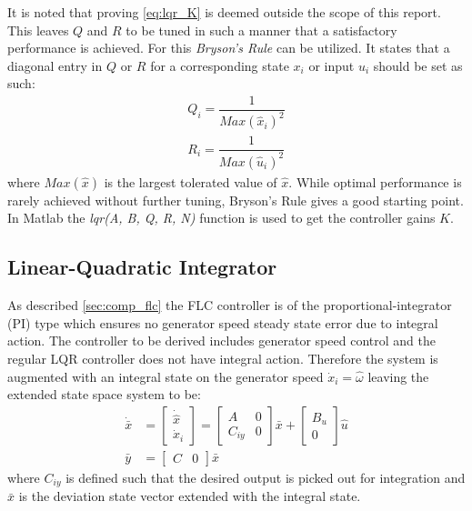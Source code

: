 It is noted that proving \cref{eq:lqr_K} is deemed outside the scope of this report. This leaves $ Q $ and $ R $ to be tuned in such a manner that a satisfactory performance is achieved. For this \textit{Bryson's Rule} can be utilized. It states that a diagonal entry in $ Q $ or $ R $ for a corresponding state $ x_i $ or input $ u_i $ should be set as such:
\begin{equation}\label{eq:bryson}
	\begin{split}
		Q_i = \dfrac{1}{Max(\hat x_i)^2} \\
		R_i = \dfrac{1}{Max(\hat u_i)^2}
	\end{split}
\end{equation}
where $ Max(\hat x) $ is the largest tolerated value of $ \hat x $. While optimal performance is rarely achieved without further tuning, Bryson's Rule gives a good starting point. In Matlab the \textit{lqr(A, B, Q, R, N)} function is used to get the controller gains $ K $.


\subsection{Linear-Quadratic Integrator} \label{sec:ctrl_lqi}
As described \cref{sec:comp_flc} the FLC controller is of the proportional-integrator (PI) type which ensures no generator speed steady state error due to integral action. The controller to be derived includes generator speed control and the regular LQR controller does not have integral action. Therefore the system is augmented with an integral state on the generator speed $ \dot x_i = \hat \omega $ leaving the extended state space system to be:
\begin{align} 
	\dot {\bar x} & = \begin{bmatrix} \dot{\hat x} \\ \dot x_i \end{bmatrix} = \begin{bmatrix} A &0 \\ C_{iy} & 0 \end{bmatrix} \bar x + \begin{bmatrix} B_u \\ 0 \end{bmatrix}  \hat u \\
	\bar y & = \begin{bmatrix} C & 0 \end{bmatrix} \bar x
\end{align}
where $ C_{iy} $ is defined such that the desired output is picked out for integration and $ \bar x $ is the deviation state vector extended with the integral state.

